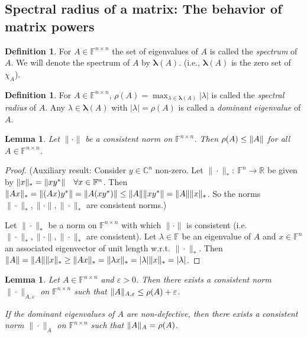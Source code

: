 \documentclass[12pt]{article}
\newtheorem{lemma}[theorem]{Lemma}
\theoremstyle{definition}
\newtheorem{definition}[theorem]{Definition}
\theoremstyle{remark}
\numberwithin{equation}{section}
\newcommand{\F}{\mathbb{F}}
\newcommand{\R}{\mathbb{R}}
\newcommand{\C}{\mathbb{C}}
\newcommand{\normempty}{\|\cdot\|}
\newcommand{\spectrum}[1]{\bm{\lambda}(#1)}
\DeclarePairedDelimiter{\norm}{\lVert}{\rVert}
\begin{document}
\subsection{Spectral radius of a matrix: The behavior of matrix powers}

\begin{definition}
  For $A \in \F^{n \times n}$ the set of eigenvalues of $A$ is called the \emph{spectrum} of $A$. We will denote the spectrum of $A$ by $\spectrum{A}$. (i.e., $\spectrum{A}$ is the zero set of $\chi_A$).
\end{definition}

\begin{definition}
  For $A \in \F^{n \times n}$, $\rho(A) = \max_{\lambda \in \spectrum{A}} |\lambda|$ is called the \emph{spectral radius} of $A$. Any $\lambda \in \spectrum{A}$ with $|\lambda| = \rho(A)$ is called a \emph{dominant eigenvalue} of $A$.
\end{definition}

\begin{lemma}
  Let $\normempty$ be a consistent norm on $\F^{n \times n}$. Then $\rho(A) \leq \norm{A}$ for all $A \in \F^{n \times n}$.
\end{lemma}

\begin{proof}
  (Auxiliary result: Consider $y \in \C^n$ non-zero. Let $\normempty_*:\ \F^n \rightarrow \R$ be given by $\norm{x}_* = \norm{xy^*} \quad \forall x \in \F^n$. Then $\norm{Ax}_* = \norm{(Ax)y^*} = \norm{A(xy^*)} \leq \norm{A} \norm{xy^*} = \norm{A} \norm{x}_*$. So the norms $\normempty_*, \normempty, \normempty_*$ are consistent norms.)

  Let $\normempty_{*}$ be a norm on $\F^{n \times n}$ with which $\normempty$ is consistent (i.e. $\normempty_{*}, \normempty, \normempty_{*}$ are consistent). Let  $\lambda \in \F$ be an eigenvalue of $A$ and $x \in \F^n$ an associated eigenvector of unit length w.r.t. $\normempty_{*}$. Then $\norm{A} = \norm{A}\norm{x}_* \geq \norm{Ax}_* = \norm{\lambda x}_* = |\lambda| \norm{x}_* = |\lambda|$.
\end{proof}

\begin{lemma}
  \label{lem:consistent-norms-spectral-radius}
  Let $A \in \F^{n \times n}$ and $\varepsilon > 0$. Then there exists a consistent norm $\normempty_{A,\varepsilon}$ on $\F^{n \times n}$ such that $\norm{A}_{A,\varepsilon} \leq \rho(A) + \varepsilon$.

  If the dominant eigenvalues of $A$ are non-defective, then there exists a consistent norm $\normempty_{A}$ on $\F^{n \times n}$ such that $\norm{A}_{A} = \rho(A)$.
\end{lemma}
\end{document}

